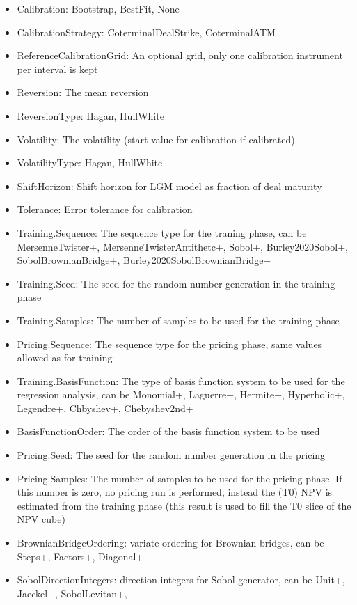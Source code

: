 \begin{itemize}
\item Calibration: Bootstrap, BestFit, None
\item CalibrationStrategy: CoterminalDealStrike, CoterminalATM
\item ReferenceCalibrationGrid: An optional grid, only one calibration instrument per interval is kept
\item Reversion: The mean reversion
\item ReversionType: Hagan, HullWhite
\item Volatility: The volatility (start value for calibration if calibrated)
\item VolatilityType: Hagan, HullWhite
\item ShiftHorizon: Shift horizon for LGM model as fraction of deal maturity
\item Tolerance: Error tolerance for calibration
\item Training.Sequence: The sequence type for the traning phase, can be MersenneTwister+, MersenneTwisterAntithetc+,
  Sobol+, Burley2020Sobol+, SobolBrownianBridge+, Burley2020SobolBrownianBridge+
\item Training.Seed: The seed for the random number generation in the training phase
\item Training.Samples: The number of samples to be used for the training phase
\item Pricing.Sequence: The sequence type for the pricing phase, same values allowed as for training
\item Training.BasisFunction: The type of basis function system to be used for the regression analysis, can be
  Monomial+, Laguerre+, Hermite+, Hyperbolic+, Legendre+, Chbyshev+, Chebyshev2nd+
\item BasisFunctionOrder: The order of the basis function system to be used
\item Pricing.Seed: The seed for the random number generation in the pricing
\item Pricing.Samples: The number of samples to be used for the pricing phase. If this number is zero, no pricing run is
  performed, instead the (T0) NPV is estimated from the training phase (this result is used to fill the T0 slice of the
  NPV cube)
\item BrownianBridgeOrdering: variate ordering for Brownian bridges, can be Steps+, Factors+, Diagonal+
\item SobolDirectionIntegers: direction integers for Sobol generator, can be Unit+, Jaeckel+, SobolLevitan+,

\end{itemize}
